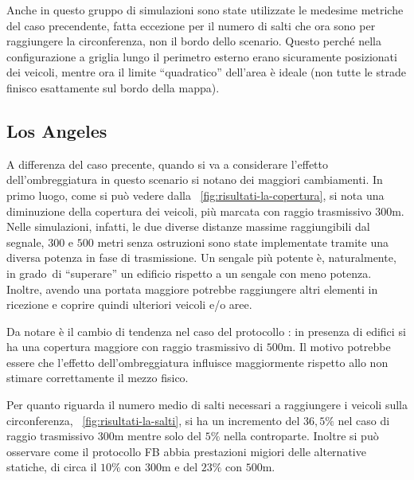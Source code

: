 %
Anche in questo gruppo di simulazioni sono state utilizzate le medesime metriche del caso precendente,
fatta eccezione per il numero di salti che ora sono per raggiungere la circonferenza, non il bordo dello scenario.
Questo perché nella configurazione a griglia lungo il perimetro esterno erano sicuramente posizionati dei veicoli,
mentre ora il limite ``quadratico'' dell'area è ideale (non tutte le strade finisco esattamente sul bordo della mappa).
%
\subsection{Los Angeles}\label{subsec:risultati-la}
A differenza del caso precente, quando si va a considerare l'effetto dell'ombreggiatura in questo scenario
si notano dei maggiori cambiamenti.
In primo luogo, come si può vedere dalla \figurename~\ref{fig:risultati-la-copertura},
si nota una diminuzione della copertura dei veicoli, più marcata con raggio trasmissivo $300$m.
Nelle simulazioni, infatti, le due diverse distanze massime raggiungibili dal segnale,
$300$ e $500$ metri senza ostruzioni sono state implementate tramite una diversa potenza in fase di trasmissione.
Un sengale più potente è, naturalmente, in grado di ``superare'' un edificio rispetto a un sengale con meno potenza.
Inoltre, avendo una portata maggiore potrebbe raggiungere altri elementi in ricezione e coprire quindi ulteriori veicoli e/o aree.

Da notare è il cambio di tendenza nel caso del protocollo \statica{}:
in presenza di edifici si ha una copertura maggiore con raggio trasmissivo di $500$m.
Il motivo potrebbe essere che l'effetto dell'ombreggiatura influisce maggiormente rispetto
allo non stimare correttamente il mezzo fisico.

Per quanto riguarda il numero medio di salti necessari a raggiungere i veicoli sulla circonferenza,
\figurename~\ref{fig:risultati-la-salti},
si ha un incremento del $36,5\%$ nel caso di raggio trasmissivo $300$m mentre solo del $5\%$ nella controparte.
Inoltre si può osservare come il protocollo FB abbia prestazioni migiori delle alternative statiche,
di circa il $10\%$ con $300$m e del $23\%$ con $500$m. %

